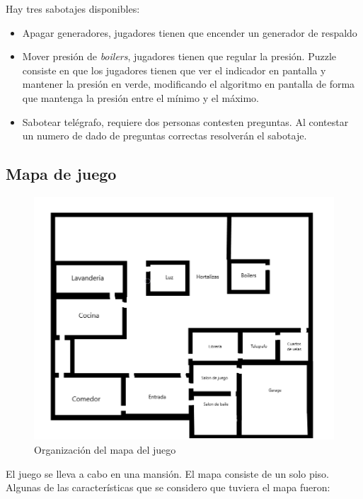Hay tres sabotajes disponibles:
\begin{itemize}
    \item Apagar generadores, jugadores tienen que encender un generador de respaldo
    \item Mover presión de \textit{boilers}, jugadores tienen que regular la presión. Puzzle consiste en que los jugadores tienen que ver el indicador en pantalla y mantener la presión en verde, modificando el algoritmo en pantalla de forma que mantenga la presión entre el mínimo y el máximo.
    \item Sabotear telégrafo, requiere dos personas contesten preguntas. Al contestar un numero de dado de preguntas correctas resolverán el sabotaje.
\end{itemize}

\subsection{Mapa de juego}
\begin{figure}[h]
    \centering
    \includegraphics[width=1\linewidth]{images/MapaJuego.png}
    \caption{Organización del mapa del juego}
    \label{fig:mapa_juego}
\end{figure}
El juego se lleva a cabo en una mansión. El mapa consiste de un solo piso. Algunas de las características que se considero que tuviera el mapa fueron:
